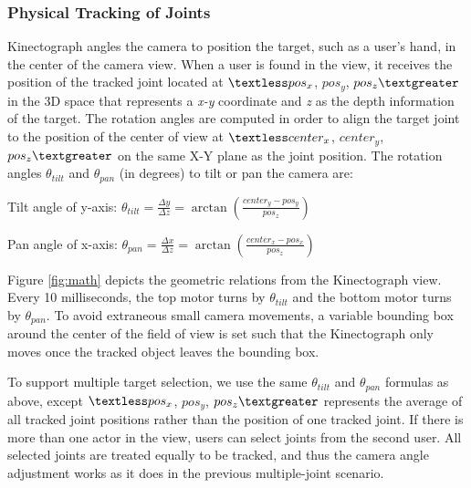 \subsubsection{Physical Tracking of Joints}
Kinectograph angles the camera to position the target, such as a user's hand, in the center of the camera view. When a user is found in the view, it receives the position of the tracked joint located at $\textless pos_{x}$, $pos_{y}$, $pos_{z} \textgreater$ in the 3D space that represents a {\em x-y} coordinate and {\em z} as the depth information of the target. The rotation angles are computed in order to align the target joint to the position of the center of view at $\textless center_{x}$, $center_{y}$, $pos_{z}\textgreater$  on the same X-Y plane as the joint position. The rotation angles $\theta_{tilt}$ and $\theta_{pan}$ (in degrees) to tilt or pan the camera are:

\vspace{12pt}
Tilt angle of y-axis:
$\theta_{tilt}=\frac{\Delta y}{\Delta z}=\arctan{(\frac{center_{y}-pos_{y}}{pos_{z}})}$

\vspace{12pt}
Pan angle of x-axis:
$\theta_{pan}=\frac{\Delta x}{\Delta z}=\arctan{(\frac{center_{x}-pos_{x}}{pos_{z}})}$
\vspace{12pt}

Figure \ref{fig:math} depicts the geometric relations from the Kinectograph view. Every 10 milliseconds, the top motor turns by $\theta_{tilt}$ and the bottom motor turns by $\theta_{pan}$. To avoid extraneous small camera movements, a variable bounding box around the center of the field of view is set such that the Kinectograph only moves once the tracked object leaves the bounding box.


To support multiple target selection, we use the same $\theta_{tilt}$ and $\theta_{pan}$ formulas as above, except $\textless pos_{x}$, $pos_{y}$, $pos_{z} \textgreater$ represents the average of all tracked joint positions rather than the position of one tracked joint.
%
If there is more than one actor in the view, users can select joints from the second user. All selected joints are treated equally to be tracked, and thus the camera angle adjustment works as it does in the previous multiple-joint scenario.

